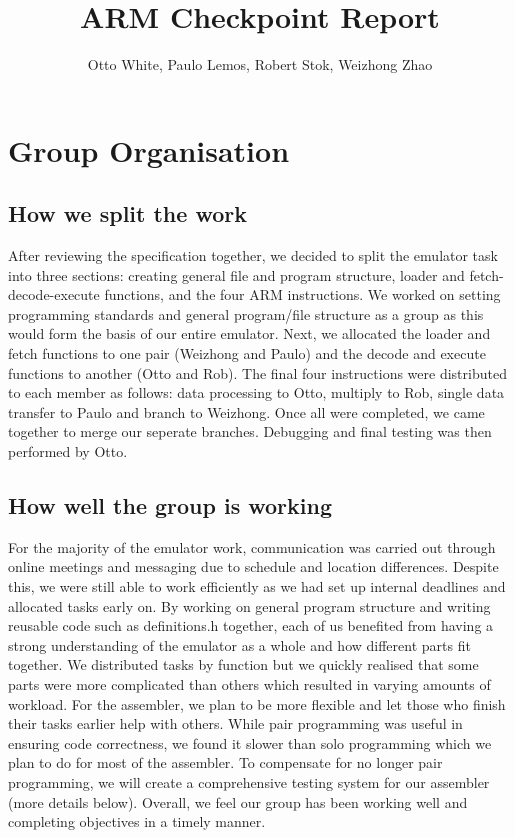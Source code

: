 \documentclass[10pt]{article}
\begin{document}
  \title{ARM Checkpoint Report}
  \author{Otto White, Paulo Lemos, Robert Stok, Weizhong Zhao}

  \maketitle

  \section*{Group Organisation}

  \subsection*{How we split the work}

After reviewing the specification together, we decided to split the emulator task into three  sections: creating general file and program structure, loader and fetch-decode-execute functions, and the four ARM instructions. We worked on setting programming standards and general program/file structure as a group as this would form the basis of our entire emulator. Next, we allocated the loader and fetch functions to one pair (Weizhong and Paulo) and the decode and execute functions to another (Otto and Rob). The final four instructions were distributed to each member as follows: data processing to Otto, multiply to Rob, single data transfer to Paulo and branch to Weizhong. Once all were completed, we came together to merge our seperate branches. Debugging and final testing was then performed by Otto.

  \subsection*{How well the group is working}

For the majority of the emulator work, communication was carried out through online meetings and messaging due to schedule and location differences. Despite this, we were still able to work efficiently as we had set up internal deadlines and allocated tasks early on. By working on general program structure and writing reusable code such as definitions.h together, each of us benefited from having a strong understanding of the emulator as a whole and how different parts fit together. We distributed tasks by function but we quickly realised that some parts were more complicated than others which resulted in varying amounts of workload. For the assembler, we plan to be more flexible and let those who finish their tasks earlier help with others. While pair programming was useful in ensuring code correctness, we found it slower than solo programming which we plan to do for most of the assembler. To compensate for no longer pair programming, we will create a comprehensive testing system for our assembler (more details below). Overall, we feel our group has been working well and completing objectives in a timely manner.
\end{document}
